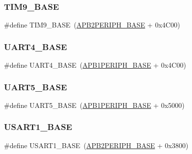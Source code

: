 \subsubsection{\texorpdfstring{TIM9\_BASE}{TIM9\_BASE}}
{\footnotesize\ttfamily \#define T\+I\+M9\+\_\+\+B\+A\+SE~(\mbox{\hyperlink{group___peripheral__memory__map_ga25b99d6065f1c8f751e78f43ade652cb}{A\+P\+B2\+P\+E\+R\+I\+P\+H\+\_\+\+B\+A\+SE}} + 0x4\+C00)}

\mbox{\label{group___peripheral__memory__map_ga94d92270bf587ccdc3a37a5bb5d20467}} 
\subsubsection{\texorpdfstring{UART4\_BASE}{UART4\_BASE}}
{\footnotesize\ttfamily \#define U\+A\+R\+T4\+\_\+\+B\+A\+SE~(\mbox{\hyperlink{group___peripheral__memory__map_ga45666d911f39addd4c8c0a0ac3388cfb}{A\+P\+B1\+P\+E\+R\+I\+P\+H\+\_\+\+B\+A\+SE}} + 0x4\+C00)}

\mbox{\label{group___peripheral__memory__map_gaa155689c0e206e6994951dc3cf31052a}} 
\subsubsection{\texorpdfstring{UART5\_BASE}{UART5\_BASE}}
{\footnotesize\ttfamily \#define U\+A\+R\+T5\+\_\+\+B\+A\+SE~(\mbox{\hyperlink{group___peripheral__memory__map_ga45666d911f39addd4c8c0a0ac3388cfb}{A\+P\+B1\+P\+E\+R\+I\+P\+H\+\_\+\+B\+A\+SE}} + 0x5000)}

\mbox{\label{group___peripheral__memory__map_ga86162ab3f740db9026c1320d46938b4d}} 
\subsubsection{\texorpdfstring{USART1\_BASE}{USART1\_BASE}}
{\footnotesize\ttfamily \#define U\+S\+A\+R\+T1\+\_\+\+B\+A\+SE~(\mbox{\hyperlink{group___peripheral__memory__map_ga25b99d6065f1c8f751e78f43ade652cb}{A\+P\+B2\+P\+E\+R\+I\+P\+H\+\_\+\+B\+A\+SE}} + 0x3800)}

